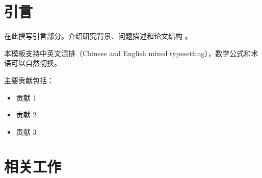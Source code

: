 \documentclass[macnew, cn]{manuscript}
\begin{document}



\section{引言}
\label{sec:intro}

在此撰写引言部分。介绍研究背景、问题描述和论文结构 \cite{qianInnovationBureaucracySoft1998}。

本模板支持中英文混排（Chinese and English mixed typesetting），数学公式和术语可以自然切换。

主要贡献包括：
\begin{itemize}
    \item 贡献 1
    \item 贡献 2
    \item 贡献 3
\end{itemize}

\section{相关工作}
\label{sec:related}
\end{document}
